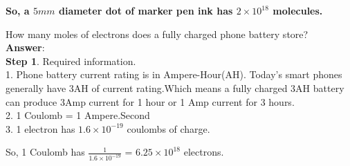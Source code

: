 \documentclass[11pt]{exam}
\begin{document}
\begin{questions}
\textbf{So, a $5mm$ diameter dot of marker pen ink has $2\times10^{18}$ molecules.}  \\
                       
 
 
\question
\label{Q8:Phone battery}

How many moles of electrons does a fully charged phone battery store? \\
\textbf{Answer}: \\
\textbf{Step 1}. Required information. \\

1. Phone battery current rating is in Ampere-Hour(AH). Today's smart phones generally have 3AH of current rating.Which means a fully charged 3AH battery can produce 3Amp current for 1 hour or 1 Amp current for 3 hours. \\

2. 1 Coulomb = 1 Ampere.Second \\
              
3. 1 electron has $1.6 \times 10^{-19}$ coulombs of charge.   
              
 So, 1 Coulomb has $\frac{1}{1.6 \times10^{-19}}$ = $6.25 \times 10^{18}$ electrons. \\   
                                               
 \\ 


\end{questions}
\end{document}
